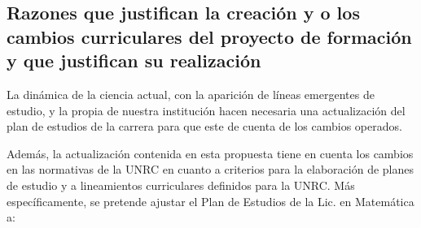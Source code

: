 \documentclass[a4paper, 12pt]{article}
\begin{document}
\subsection{Razones que justifican la creación y o los cambios curriculares del proyecto de formación  y que justifican su realización}

La dinámica de la ciencia actual, con la aparición de líneas emergentes  de estudio,  y la propia  de nuestra institución hacen necesaria una actualización del plan de estudios de la carrera para que este de cuenta de los cambios operados.   


Además, la actualización  contenida en esta propuesta  tiene en cuenta los   cambios en las normativas de la UNRC en cuanto a criterios para la elaboración de  planes de estudio y a lineamientos curriculares definidos para la UNRC. Más específicamente, se pretende  ajustar el Plan de Estudios de la Lic. en Matemática a:
\end{document}
